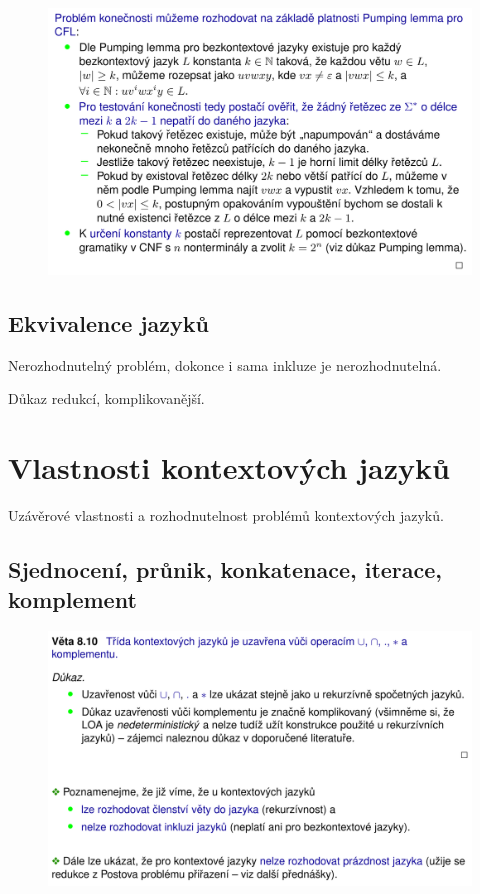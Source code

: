 \begin{figure}[H]
    \centering
    \includegraphics[width=1\linewidth]{uzaverove_vlastnosti_L2_03.pdf}
\end{figure}

\subsection{Ekvivalence jazyků}

\begin{compactitem}
    \item Nerozhodnutelný problém, dokonce i sama inkluze je nerozhodnutelná.
    \item Důkaz redukcí, komplikovanější.
\end{compactitem}


\section{Vlastnosti kontextových jazyků}

Uzávěrové vlastnosti a rozhodnutelnost problémů kontextových jazyků.

\subsection{Sjednocení, průnik, konkatenace, iterace, komplement}

\begin{figure}[H]
    \centering
    \includegraphics[width=1\linewidth]{uzaverove_vlastnosti_L1.pdf}
\end{figure}

